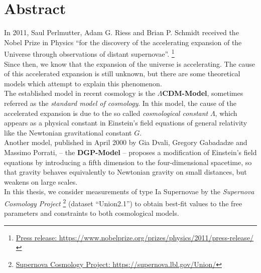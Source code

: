 \chapter*{Abstract}
\thispagestyle{empty}

In 2011, Saul Perlmutter, Adam G. Riess and Brian P. Schmidt received the Nobel Prize in Physics \enquote{for the discovery of the accelerating expansion of the Universe through observations of distant supernovae}. \footnote{\href{https://www.nobelprize.org/prizes/physics/2011/press-release/}{Press release: https://www.nobelprize.org/prizes/physics/2011/press-release/}} \\
Since then, we know that the expansion of the universe is accelerating. 
The cause of this accelerated expansion is still unknown, but there are some theoretical models which attempt to explain this phenomenon. \\

\noindent The established model in recent cosmology is the \textbf{$\Lambda$CDM-Model}, sometimes referred as the \textit{standard model of cosmology}. 
In this model, the cause of the accelerated expansion is due to the so called \textit{cosmological constant} $\Lambda$, which appears as a physical constant in Einstein's field equations of general relativity like the Newtonian gravitational constant $G$. \\

\noindent Another model, published in April 2000 by Gia Dvali, Gregory Gabadadze and Massimo Porrati, -- the \textbf{DGP-Model} -- proposes a modification of Einstein's field equations by introducing a fifth dimension to the four-dimensional spacetime, so that gravity behaves equivalently to Newtonian gravity on small distances, but weakens on large scales. \\

\noindent In this thesis, we consider measurements of type Ia Supernovae by the \textit{Supernova Cosmology Project} \footnote{\href{https://supernova.lbl.gov/Union/}{Supernova Cosmology Project: https://supernova.lbl.gov/Union/}} (dataset ``Union2.1'') to obtain best-fit values to the free parameters and constraints to both cosmological models.
